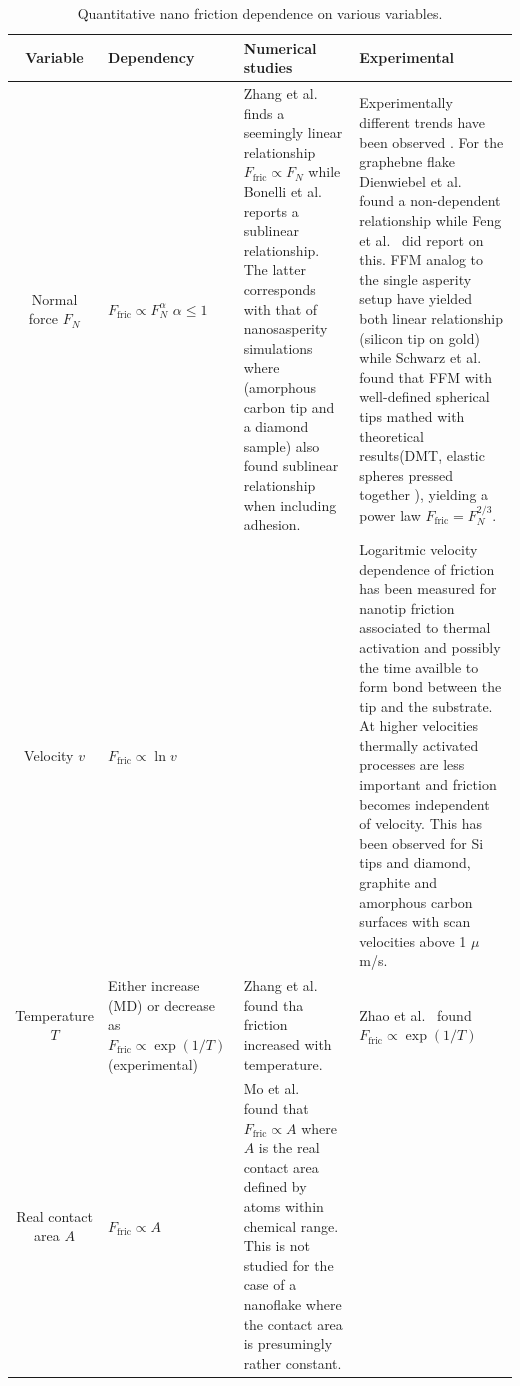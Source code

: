 \begin{table}[H]
  \begin{center}
  \caption{Quantitative nano friction dependence on various variables.}
  \label{tab:var_dep}
  \begin{tabular}{ | c | C{3cm}| m{5cm}| m{5cm}|} \hline
  \textbf{Variable} & \textbf{Dependency} & \textbf{Numerical studies} & \textbf{Experimental} \\ \hline 
  Normal force $F_N$ 
  &  
  $F_{\text{fric}} \propto F_N^{\alpha}$ \newline $\alpha \le 1$
  & Zhang et al.\ \cite{ma12091425} finds a seemingly linear relationship $F_{\text{fric}} \propto F_N$ while Bonelli et al.\ \cite{bonelli_atomistic_2009} reports a sublinear relationship. The latter corresponds with that of nanosasperity simulations where \cite{mo_friction_2009} (amorphous carbon tip and a diamond sample) also found sublinear relationship when including adhesion.
  & Experimentally different trends have been observed \cite[p. 200]{gnecco_meyer_2015}. For the graphebne flake Dienwiebel et al.\ \cite{DIENWIEBEL2005197} found a non-dependent relationship while Feng et al.\ \cite{feng_superlubric_2013} did report on this. FFM analog to the single asperity setup have yielded both linear relationship \cite{gao_frictional_2004} (silicon tip on gold) while Schwarz et al.\ \cite{PhysRevB.56.6987} found that FFM with well-defined spherical tips mathed with theoretical results(DMT, elastic spheres pressed together \cite[p. 200]{gnecco_meyer_2015}), yielding a power law $F_{\text{fric}} = F_N^{2/3}$. 
  \\ \hline
  Velocity $v$& $F_{\text{fric}} \propto \ln{v}$ 
  &  
  & Logaritmic velocity dependence of friction has been measured for nanotip friction \cite[p. 201]{gnecco_meyer_2015} associated to thermal activation and possibly the time availble to form bond between the tip and the substrate. At higher velocities thermally activated processes are less important and friction becomes independent of velocity. This has been observed for Si tips and diamond, graphite and amorphous carbon surfaces with scan velocities above 1 $\mu$m/s.
  \\ \hline
  Temperature $T$
  & Either increase (MD) or decrease as $F_{\text{fric}} \propto \exp{(1/T)}$  (experimental)
  &  Zhang et al.\ \cite{ma12091425} found tha friction increased with temperature. 
  & Zhao et al.\ \cite{zhao_thermally_2007} found $F_{\text{fric}} \propto \exp({1/T})$ \\ \hline
  Real contact area $A$ 
  & $F_{\text{fric}} \propto A$ 
  & Mo et al.\ \cite{mo_friction_2009} found that $F_{\text{fric}} \propto A$ where $A$ is the real contact area defined by atoms within chemical range. This is not studied for the case of a nanoflake where the contact area is presumingly rather constant.
  & \\ \hline
  \end{tabular}
  \end{center}
\end{table}


